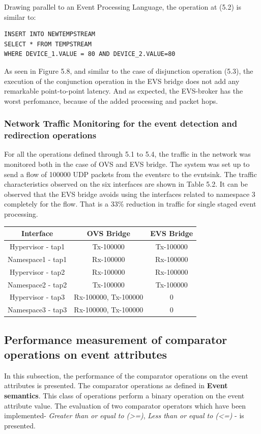 Drawing parallel to an Event Processing Language, the operation at (5.2) is similar to:

\begin{verbatim}
INSERT INTO NEWTEMPSTREAM
SELECT * FROM TEMPSTREAM
WHERE DEVICE_1.VALUE = 80 AND DEVICE_2.VALUE=80
\end{verbatim}

As seen in Figure 5.8, and similar to the case of disjunction operation (5.3), the execution of the conjunction operation in the EVS bridge does not add any remarkable point-to-point latency. And as expected, the EVS-broker has the worst perfomance, because of the added processing and packet hops.

\subsubsection{Network Traffic Monitoring for the event detection and redirection operations}
For all the operations defined through 5.1 to 5.4, the traffic in the network was monitored both in the case of OVS and EVS bridge. The system was set up to send a flow of 100000 UDP packets from the eventsrc to the evntsink. The traffic characteristics observed on the six interfaces are shown in Table 5.2. It can be observed that the EVS bridge avoids using the interfaces related to namespace 3 completely for the flow. That is a 33\% reduction in traffic for single staged event processing.

\begin{center}
	 \label{tab:title} 
	\begin{tabular}{ |c|c|c| }
		\hline
		 \textbf{Interface} &  \textbf{OVS Bridg}e &  \textbf{EVS Bridge} \\\toprule
		\hline
		Hypervisor - tap1 & Tx-100000 & Tx-100000  \\
		\hline 
		Namespace1 - tap1 & Rx-100000 & Rx-100000 \\
		\hline		
		Hypervisor - tap2 &  Rx-100000 & Rx-100000  \\ 
		\hline
		Namespace2 - tap2 & Tx-100000 & Tx-100000 \\
		\hline		
		Hypervisor - tap3 & Rx-100000, Tx-100000 & 0  \\ 
		\hline
		Namespace3 - tap3 & Rx-100000, Tx-100000 & 0 \\
		\hline
	\end{tabular}
\end{center}


\subsection{Performance measurement of comparator operations on event attributes}
In this subsection, the performance of the comparator operations on the event attributes is presented. The comparator operations as defined in \textbf{Event semantics}. This class of operations perform a binary operation on the event attribute value. The evaluation of two comparator operators which have been implemented- \textit{Greater than or equal to (>=)}, \textit{Less than or equal to (<=)} - is presented. 

